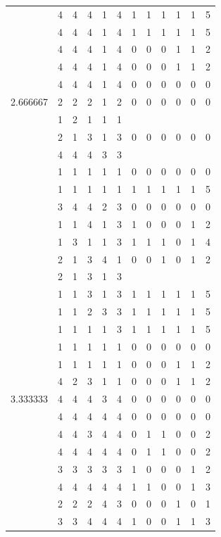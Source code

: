 \documentclass[]{book}
\theoremstyle{definition}
\theoremstyle{definition}
\theoremstyle{definition}
\theoremstyle{remark}
\begin{document}
\begin{table}
{\begin{tabular}[t]{rrrrrrrrrrrr}
 & 4 & 4 & 4 & 1 & 4 & 1 & 1 & 1 & 1 & 1 & 5\\
 & 4 & 4 & 4 & 1 & 4 & 1 & 1 & 1 & 1 & 1 & 5\\
 & 4 & 4 & 4 & 1 & 4 & 0 & 0 & 0 & 1 & 1 & 2\\
 & 4 & 4 & 4 & 1 & 4 & 0 & 0 & 0 & 1 & 1 & 2\\
 & 4 & 4 & 4 & 1 & 4 & 0 & 0 & 0 & 0 & 0 & 0\\
2.666667 & 2 & 2 & 2 & 1 & 2 & 0 & 0 & 0 & 0 & 0 & 0\\
 & 1 & 2 & 1 & 1 & 1 &  &  &  &  &  & \\
 & 2 & 1 & 3 & 1 & 3 & 0 & 0 & 0 & 0 & 0 & 0\\
 & 4 & 4 & 4 & 3 & 3 &  &  &  &  &  & \\
 & 1 & 1 & 1 & 1 & 1 & 0 & 0 & 0 & 0 & 0 & 0\\
 & 1 & 1 & 1 & 1 & 1 & 1 & 1 & 1 & 1 & 1 & 5\\
 & 3 & 4 & 4 & 2 & 3 & 0 & 0 & 0 & 0 & 0 & 0\\
 & 1 & 1 & 4 & 1 & 3 & 1 & 0 & 0 & 0 & 1 & 2\\
 & 1 & 3 & 1 & 1 & 3 & 1 & 1 & 1 & 0 & 1 & 4\\
 & 2 & 1 & 3 & 4 & 1 & 0 & 0 & 1 & 0 & 1 & 2\\
 & 2 & 1 & 3 & 1 & 3 &  &  &  &  &  & \\
 & 1 & 1 & 3 & 1 & 3 & 1 & 1 & 1 & 1 & 1 & 5\\
 & 1 & 1 & 2 & 3 & 3 & 1 & 1 & 1 & 1 & 1 & 5\\
 & 1 & 1 & 1 & 1 & 3 & 1 & 1 & 1 & 1 & 1 & 5\\
 & 1 & 1 & 1 & 1 & 1 & 0 & 0 & 0 & 0 & 0 & 0\\
 & 1 & 1 & 1 & 1 & 1 & 0 & 0 & 0 & 1 & 1 & 2\\
 & 4 & 2 & 3 & 1 & 1 & 0 & 0 & 0 & 1 & 1 & 2\\
3.333333 & 4 & 4 & 4 & 3 & 4 & 0 & 0 & 0 & 0 & 0 & 0\\
 & 4 & 4 & 4 & 4 & 4 & 0 & 0 & 0 & 0 & 0 & 0\\
 & 4 & 4 & 3 & 4 & 4 & 0 & 1 & 1 & 0 & 0 & 2\\
 & 4 & 4 & 4 & 4 & 4 & 0 & 1 & 1 & 0 & 0 & 2\\
 & 3 & 3 & 3 & 3 & 3 & 1 & 0 & 0 & 0 & 1 & 2\\
 & 4 & 4 & 4 & 4 & 4 & 1 & 1 & 0 & 0 & 1 & 3\\
 & 2 & 2 & 2 & 4 & 3 & 0 & 0 & 0 & 1 & 0 & 1\\
 & 3 & 3 & 4 & 4 & 4 & 1 & 0 & 0 & 1 & 1 & 3\\

\end{tabular}}
\end{table}
\end{document}
